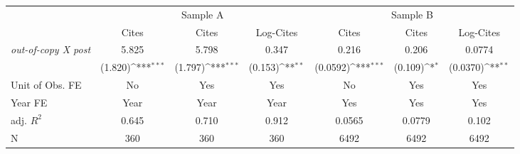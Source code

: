 {
\def\sym#1{\ifmmode^{#1}\else\(^{#1}\)\fi}
\begin{tabular*}{\hsize}{@{\hskip\tabcolsep\extracolsep\fill}l*{6}{c}}
\toprule
            &\multicolumn{3}{c}{Sample A}                                     &\multicolumn{3}{c}{Sample B}                                     \\\cmidrule(lr){2-4}\cmidrule(lr){5-7}
            &\multicolumn{1}{c}{Cites}&\multicolumn{1}{c}{Cites}&\multicolumn{1}{c}{Log-Cites}&\multicolumn{1}{c}{Cites}&\multicolumn{1}{c}{Cites}&\multicolumn{1}{c}{Log-Cites}\\
\midrule
\emph{out-of-copy X post}&       5.825         &       5.798         &       0.347         &       0.216         &       0.206         &      0.0774         \\
            &     (1.820)\sym{***}&     (1.797)\sym{***}&     (0.153)\sym{**} &    (0.0592)\sym{***}&     (0.109)\sym{*}  &    (0.0370)\sym{**} \\
\midrule
Unit of Obs. FE&          No         &         Yes         &         Yes         &          No         &         Yes         &         Yes         \\
Year FE     &        Year         &        Year         &        Year         &         Yes         &         Yes         &         Yes         \\
adj. $R^2$  &       0.645         &       0.710         &       0.912         &      0.0565         &      0.0779         &       0.102         \\
N           &         360         &         360         &         360         &        6492         &        6492         &        6492         \\
\bottomrule
\end{tabular*}
}
